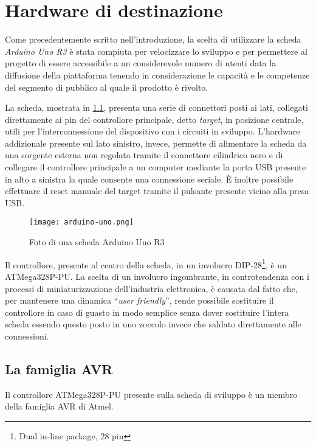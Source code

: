 \chapter{Hardware di destinazione}
    
Come precedentemente scritto nell'introduzione, la scelta di utilizzare la scheda \textit{Arduino Uno R3} è stata compiuta per velocizzare lo sviluppo e per permettere al progetto di essere accessibile a un considerevole numero di utenti data la diffusione della piattaforma tenendo in considerazione le capacità e le competenze del segmento di pubblico al quale il prodotto è rivolto.

La scheda, mostrata in \cref{fig:arduino-uno-r3}, presenta una serie di connettori posti ai lati, collegati direttamente ai pin del controllore principale, detto \textit{target}, in posizione centrale, utili per l'interconnessione del dispositivo con i circuiti in sviluppo.
L'hardware addizionale presente sul lato sinistro, invece, permette di alimentare la scheda da una sorgente esterna non regolata tramite il connettore cilindrico nero e di collegare il controllore principale a un computer mediante la porta USB presente in alto a sinistra la quale consente una connessione seriale.
È inoltre possibile effettuare il reset manuale del target tramite il pulsante presente vicino alla presa USB.\@

\begin{figure}[h]
    \centering
    \texttt{[image: arduino-uno.png]}
    \caption[]{Foto di una scheda Arduino Uno R3\cite{img:arduino-uno-r3}}\label{fig:arduino-uno-r3}
\end{figure}

Il controllore, presente al centro della scheda, in un involucro DIP-28\footnote{Dual in-line package, 28 pin}, è un ATMega328P-PU\cite{site:arduino-uno-doc}. La scelta di un involucro ingombrante, in controtendenza con i processi di miniaturizzazione dell'industria elettronica, è causata dal fatto che, per mantenere una dinamica ``\textit{user friendly}'', rende possibile sostituire il controllore in caso di guasto in modo semplice senza dover sostituire l'intera scheda essendo questo posto in uno zoccolo invece che saldato direttamente alle connessioni\cite{site:arduino-uno-doc}.

\section{La famiglia AVR}

Il controllore ATMega328P-PU presente sulla scheda di sviluppo è un membro della famiglia AVR di Atmel\cite[1]{avr:m328p}.

